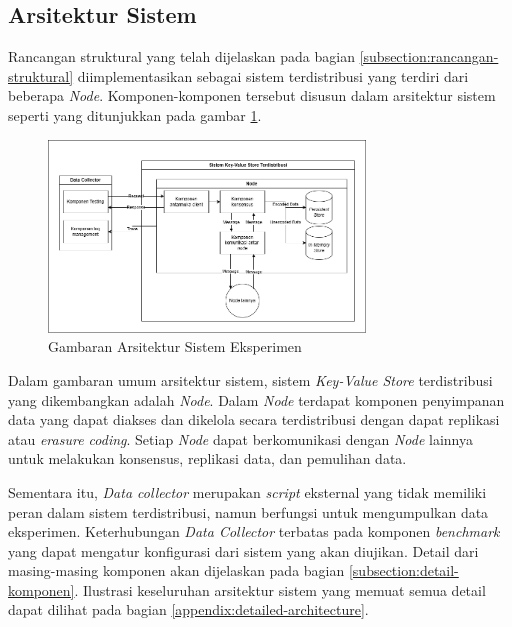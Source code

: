 \subsection{Arsitektur Sistem}
\label{subsection:system-architecture}

Rancangan struktural yang telah dijelaskan pada bagian \ref{subsection:rancangan-struktural} diimplementasikan sebagai sistem terdistribusi yang terdiri dari beberapa \textit{Node}. Komponen-komponen tersebut disusun dalam arsitektur sistem seperti yang ditunjukkan pada gambar \ref{fig:general-architecture}.

\begin{figure}[ht]
    \centering
    \includegraphics[width=0.75\textwidth]{resources/chapter-3/general-architecture.png}
    \caption{Gambaran Arsitektur Sistem Eksperimen}
    \label{fig:general-architecture}
\end{figure}

Dalam gambaran umum arsitektur sistem, sistem \textit{Key-Value Store} terdistribusi yang dikembangkan adalah \textit{Node}. Dalam \textit{Node} terdapat komponen penyimpanan data yang dapat diakses dan dikelola secara terdistribusi dengan dapat replikasi atau \textit{erasure coding}. Setiap \textit{Node} dapat berkomunikasi dengan \textit{Node} lainnya untuk melakukan konsensus, replikasi data, dan pemulihan data.

Sementara itu, \textit{Data collector} merupakan \textit{script} eksternal yang tidak memiliki peran dalam sistem terdistribusi, namun berfungsi untuk mengumpulkan data eksperimen. Keterhubungan \textit{Data Collector} terbatas pada komponen \textit{benchmark} yang dapat mengatur konfigurasi dari sistem yang akan diujikan. Detail dari masing-masing komponen akan dijelaskan pada bagian \ref{subsection:detail-komponen}. Ilustrasi keseluruhan arsitektur sistem yang memuat semua detail dapat dilihat pada bagian \ref{appendix:detailed-architecture}.

